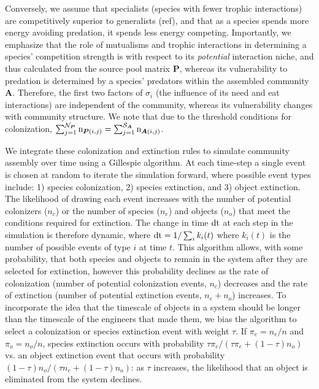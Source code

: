 \documentclass[twocolumn,preprintnumbers,amsmath,amssymb,superscriptaddress]{revtex4}
\newcommand{\rr}[1]{{\rm #1}}
\begin{document}
Conversely, we assume that specialists (species with fewer trophic interactions) are competitively superior to generalists (ref), and that as a species spends more energy avoiding predation, it spends less energy competing.
Importantly, we emphasize that the role of mutualisms and trophic interactions in determining a species' competition strength is with respect to its \emph{potential} interaction niche, and thus calculated from the source pool matrix $\bm P$, whereas its vulnerability to predation is determined by a species' predators within the assembled community $\bm A$.
Therefore, the first two factors of $\sigma_i$ (the influence of its need and eat interactions) are independent of the community, whereas its vulnerability changes with community structure.
We note that due to the threshold conditions for colonization, $\sum_{j=1}^{\mathcal{N}_{\bm P}} \rr{n}_{{\bm P}(i,j)} = \sum_{j=1}^{\mathcal{S}_{\bm A}} \rr{n}_{{\bm A}(i,j)}$.

We integrate these colonization and extinction rules to simulate community assembly over time using a Gillespie algorithm.
At each time-step a single event is chosen at random to iterate the simulation forward, where possible event types include: 1) species colonization, 2) species extinction, and 3) object extinction.
The likelihood of drawing each event increases with the number of potential colonizers ($n_c$) or the number of species ($n_e$) and objects ($n_o$) that meet the conditions required for extinction.
The change in time $\rr{dt}$ at each step in the simulation is therefore dynamic, where $\rr{dt} = 1/\sum_i k_i(t)$ where $k_i(t)$ is the number of possible events of type $i$ at time $t$.
This algorithm allows, with some probability, that both species and objects to remain in the system after they are selected for extinction, however this probability declines as the rate of colonization (number of potential colonization events, $n_c$) decreases and the rate of extinction (number of potential extinction events, $n_e + n_o$) increases.
To incorporate the idea that the timescale of objects in a system should be longer than the timescale of the engineers that made them, we bias the algorithm to select a colonization or species extinction event with weight $\tau$.
If $\pi_e = n_e/n$ and $\pi_o = n_o/n$, species extinction occurs with probability $\tau \pi_e/(\tau \pi_e + (1-\tau)n_o)$ vs. an object extinction event that occurs with probability $(1-\tau) n_o/(\tau n_e + (1-\tau)n_o)$: as $\tau$ increases, the likelihood that an object is eliminated from the system declines.
\end{document}
